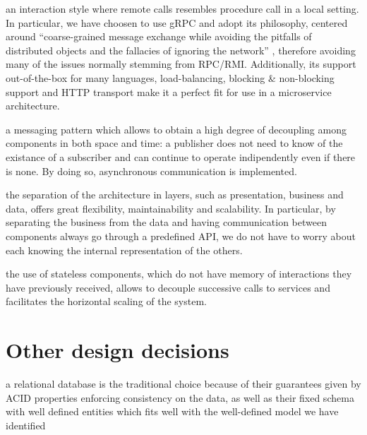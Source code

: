 \begin{description}[leftmargin=0pt]
    \item[RPC:] an interaction style where remote calls resembles procedure call in a local setting. In particular, we have
          choosen to use gRPC and adopt its philosophy, centered around ``coarse-grained message exchange while avoiding the
          pitfalls of distributed objects and the fallacies of ignoring the network'' \cite{gRPCPrinciples}, therefore
          avoiding many of the issues normally stemming from RPC/RMI. Additionally, its support out-of-the-box for many
          languages, load-balancing, blocking \& non-blocking support and HTTP transport make it a perfect fit for use in a
          microservice architecture.
    \item[Pub-sub/Message queueing:] a messaging pattern which allows to obtain a high degree of decoupling among components
          in both space and time: a publisher does not need to know of the existance of a subscriber and can continue to
          operate indipendently even if there is none. By doing so, asynchronous communication is implemented.
    \item[Tiered architecture:] the separation of the architecture in layers, such as presentation, business and data,
          offers great flexibility, maintainability and scalability. In particular, by separating the business from the data
          and having communication between components always go through a predefined API, we do not have to worry about
          each knowing the internal representation of the others.
    \item[Stateless components:] the use of stateless components, which do not have memory of interactions they have previously
          received, allows to decouple successive calls to services and facilitates the horizontal scaling of the system.
\end{description}

\section{Other design decisions}
\begin{description}[leftmargin=0pt]
    \item[Relational DBMS:]
          a relational database is the traditional choice because of their guarantees given by ACID properties
          enforcing consistency on the data, as well as their fixed schema with well defined entities which fits
          well with the well-defined model we have identified
\end{description}
